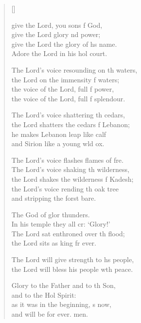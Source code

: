 \settowidth{\versewidth}{The Lord’s voice resounding on the waters, *}
\begin{verse}[\versewidth]
  \begin{patverse}
     give the Lord, you sons f God,\Med\\
    give the Lord glory nd power;\\
give the Lord the glory of h\pointup{\i}s name.\Med\\
    Adore the Lord in his hol court.

The Lord’s voice resounding on th waters,\Med\\
    the Lord on the immensity f waters;\\
the voice of the Lord, full f power,\Med\\
    the voice of the Lord, full f splendour.

The Lord’s voice shattering th cedars,\Med\\
    the Lord shatters the cedars f Lebanon;\\
he makes Lebanon leap like  calf\Med\\
    and Sirion like a young w\pointup{\i}ld ox.

The Lord’s voice flashes flames of f\pointup{\i}re.\Flex\\
    The Lord’s voice shaking th wilderness,\Med\\
    the Lord shakes the wilderness f Kadesh;\\
the Lord’s voice rending th oak tree\Med\\
    and stripping the forst bare.

The God of glor thunders.\Med\\
    In his temple they all cr: ‘Glory!’\\
The Lord sat enthroned over th flood;\Med\\
    the Lord sits as king fr ever.

The Lord will give strength to h\pointup{\i}s people,\Med\\
    the Lord will bless his people w\pointup{\i}th peace.

Glory to the Father and to th Son,\Med\\
    and to the Hol Spirit:\\
as it was in the beginning, \pointup{\i}s now,\Med\\
    and will be for ever. men.
  \end{patverse}
\end{verse}
